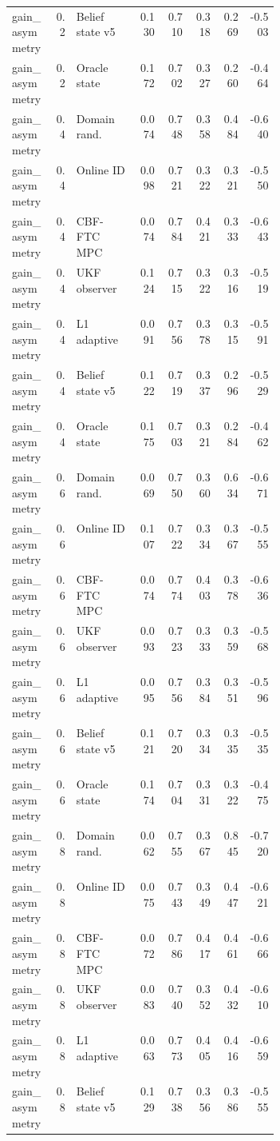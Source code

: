 \documentclass{article}
\begin{document}
\begin{center}
\begin{longtable}{p{0.16\linewidth}rp{0.23\linewidth}rrrrr}
gain\_asymmetry & 0.2 & Belief state v5 & 0.130 & 0.710 & 0.318 & 0.269 & -0.503\\
gain\_asymmetry & 0.2 & Oracle state & 0.172 & 0.702 & 0.327 & 0.260 & -0.464\\
gain\_asymmetry & 0.4 & Domain rand. & 0.074 & 0.748 & 0.358 & 0.484 & -0.640\\
gain\_asymmetry & 0.4 & Online ID & 0.098 & 0.721 & 0.322 & 0.321 & -0.550\\
gain\_asymmetry & 0.4 & CBF-FTC MPC & 0.074 & 0.784 & 0.421 & 0.333 & -0.643\\
gain\_asymmetry & 0.4 & UKF observer & 0.124 & 0.715 & 0.322 & 0.316 & -0.519\\
gain\_asymmetry & 0.4 & L1 adaptive & 0.091 & 0.756 & 0.378 & 0.315 & -0.591\\
gain\_asymmetry & 0.4 & Belief state v5 & 0.122 & 0.719 & 0.337 & 0.296 & -0.529\\
gain\_asymmetry & 0.4 & Oracle state & 0.175 & 0.703 & 0.321 & 0.284 & -0.462\\
gain\_asymmetry & 0.6 & Domain rand. & 0.069 & 0.750 & 0.360 & 0.634 & -0.671\\
gain\_asymmetry & 0.6 & Online ID & 0.107 & 0.722 & 0.334 & 0.367 & -0.555\\
gain\_asymmetry & 0.6 & CBF-FTC MPC & 0.074 & 0.774 & 0.403 & 0.378 & -0.636\\
gain\_asymmetry & 0.6 & UKF observer & 0.093 & 0.723 & 0.333 & 0.359 & -0.568\\
gain\_asymmetry & 0.6 & L1 adaptive & 0.095 & 0.756 & 0.384 & 0.351 & -0.596\\
gain\_asymmetry & 0.6 & Belief state v5 & 0.121 & 0.720 & 0.334 & 0.335 & -0.535\\
gain\_asymmetry & 0.6 & Oracle state & 0.174 & 0.704 & 0.331 & 0.322 & -0.475\\
gain\_asymmetry & 0.8 & Domain rand. & 0.062 & 0.755 & 0.367 & 0.845 & -0.720\\
gain\_asymmetry & 0.8 & Online ID & 0.075 & 0.743 & 0.349 & 0.447 & -0.621\\
gain\_asymmetry & 0.8 & CBF-FTC MPC & 0.072 & 0.786 & 0.417 & 0.461 & -0.666\\
gain\_asymmetry & 0.8 & UKF observer & 0.083 & 0.740 & 0.352 & 0.432 & -0.610\\
gain\_asymmetry & 0.8 & L1 adaptive & 0.063 & 0.773 & 0.405 & 0.416 & -0.659\\
gain\_asymmetry & 0.8 & Belief state v5 & 0.129 & 0.738 & 0.356 & 0.386 & -0.555\\

\end{longtable}
\end{center}
\end{document}
